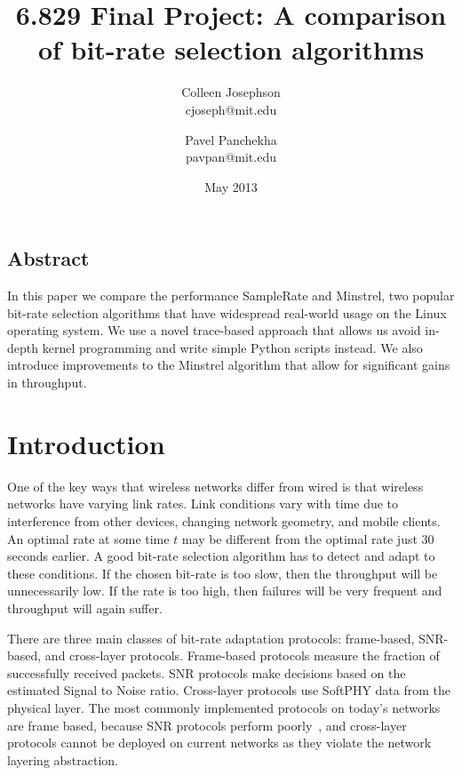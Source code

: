 \documentclass[letterpaper,twocolumn,10pt]{article}
\begin{document}

\title{\Large \bf 6.829 Final Project: A comparison of bit-rate selection algorithms}
\author{
{\rm Colleen Josephson}\\
cjoseph@mit.edu
\and
{\rm Pavel Panchekha}\\
pavpan@mit.edu
} %

\date{May 2013}

\maketitle


\subsection*{Abstract}
In this paper we compare the performance SampleRate and Minstrel, two
popular bit-rate selection algorithms that have widespread real-world
usage on the Linux operating system. We use a novel trace-based
approach that allows us avoid in-depth kernel programming and write
simple Python scripts instead. We also introduce improvements to the
Minstrel algorithm that allow for significant gains in throughput.
\section{Introduction}

One of the key ways that wireless networks differ from wired is that
wireless networks have varying link rates. Link conditions vary with
time due to interference from other devices, changing network
geometry, and mobile clients. An optimal rate at some time $t$ may be
different from the optimal rate just 30 seconds earlier. A good
bit-rate selection algorithm has to detect and adapt to these
conditions. If the chosen bit-rate is too slow, then the throughput
will be unnecessarily low. If the rate is too high, then failures will
be very frequent and throughput will again suffer.

There are three main classes of bit-rate adaptation protocols:
frame-based, SNR-based, and cross-layer protocols. Frame-based
protocols measure the fraction of successfully received packets. SNR
protocols make decisions based on the estimated Signal to Noise
ratio. Cross-layer protocols use SoftPHY data from the physical
layer. The most commonly implemented protocols on today's networks are
frame based, because SNR protocols perform poorly~\cite{samplerate},
and cross-layer protocols cannot be deployed on current networks as
they violate the network layering abstraction.
\end{document}
